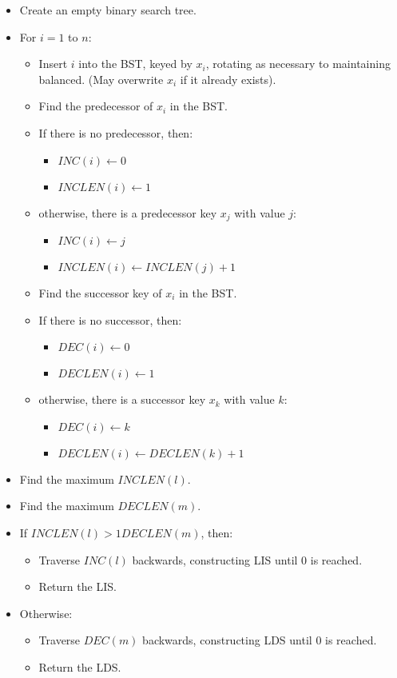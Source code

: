 \documentclass[12pt]{article}
\begin{document}
\begin{itemize}
\item Create an empty binary search tree.
\item For $i=1$ to $n$:
\begin{itemize}
\item Insert $i$ into the BST, keyed by $x_i$, rotating as necessary to
maintaining balanced. (May overwrite $x_i$ if it already exists).
\item Find the predecessor of $x_i$ in the BST.
\item If there is no predecessor, then:
\begin{itemize}
\item $INC(i) \gets 0$
\item $INCLEN(i) \gets 1$
\end{itemize}
\item otherwise, there is a predecessor key $x_j$ with value $j$:
\begin{itemize}
\item $INC(i) \gets j$
\item $INCLEN(i) \gets INCLEN(j)+1$
\end{itemize}
\item Find the successor key of $x_i$ in the BST.

\item If there is no successor, then:
\begin{itemize}
\item $DEC(i) \gets 0$
\item $DECLEN(i) \gets 1$
\end{itemize}
\item otherwise, there is a successor key $x_k$ with value $k$:
\begin{itemize}
\item $DEC(i) \gets k$
\item $DECLEN(i) \gets DECLEN(k)+1$
\end{itemize}

\end{itemize}

\item Find the maximum $INCLEN(l)$.
\item Find the maximum $DECLEN(m)$.
\item If $INCLEN(l) > 1 DECLEN(m)$, then:
\begin{itemize}
\item Traverse $INC(l)$ backwards, constructing LIS until $0$ is reached.
\item Return the LIS.
\end{itemize}
\item Otherwise:
\begin{itemize}
\item Traverse $DEC(m)$ backwards, constructing LDS until $0$ is reached.
\item Return the LDS.
\end{itemize}
\end{itemize}
\end{document}
